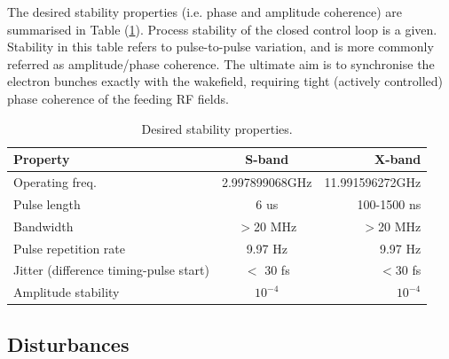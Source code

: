 \documentclass[12pt]{amsart}
\begin{document}
The desired stability properties (i.e. phase and amplitude coherence) are summarised in Table (\ref{tab:table1}).
Process stability of the closed control loop is a given. Stability in this table refers to pulse-to-pulse variation, and is more commonly referred 
as amplitude/phase coherence.
The ultimate aim is to synchronise the electron bunches exactly with the wakefield, requiring tight (actively controlled) phase coherence
of the feeding RF fields.
\begin{table}
  \begin{center}
    \caption{Desired stability properties.}
    \label{tab:table1}
    \begin{tabular}{|l || c|r|} %
      \hline
      \textbf{Property} & \textbf{S-band} & \textbf{X-band}\\
      \hline
          Operating freq. 	& 2.997899068GHz 	& 11.991596272GHz  \\
          Pulse length 		& 6 us 			& 100-1500 ns \\
          Bandwidth 		& $>$20 MHz 		& $>$20 MHz \\
          Pulse repetition rate	& 9.97 Hz			& 9.97 Hz \\
         Jitter (difference timing-pulse start)		& $<$ 30 fs	& $<$30 fs \\
          Amplitude stability		& $10^{-4}$ 	& $10^{-4}$ \\
          \hline
    \end{tabular}
  \end{center}
\end{table}




\subsection{Disturbances}
\end{document}
